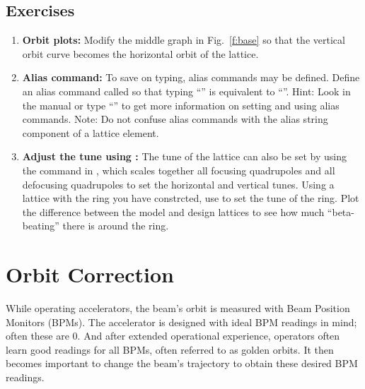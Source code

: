 \documentclass{hitec}     %
\begin{document}
{{{{\vspace{1in}

\subsection{Exercises}

\begin{enumerate}[leftmargin=*]
%
\item {\bf Orbit plots:} Modify the middle graph in Fig.~\ref{f:base} so that the vertical orbit curve becomes the horizontal orbit of the  lattice.
%
\item {\bf Alias command:} To save on typing, alias commands may be defined. Define an alias command called  so that typing ``'' is equivalent to ``''. Hint: Look in the manual or type ``'' to get more information on setting and using alias commands.
Note: Do not confuse \tao alias commands with the alias string component of a lattice element.
%
\item {\bf Adjust the tune using :} The tune of the lattice can also be set by using the  command in \tao, which scales together all focusing quadrupoles and all defocusing quadrupoles to set the horizontal and vertical tunes. Using a lattice with the ring you have constrcted, use  to set the tune of the ring. Plot the difference between the model and design lattices to see how much ``beta-beating'' there is around the ring.
%
\end{enumerate}

\newpage

\section{Orbit Correction}
\label{s:orbit}

While operating accelerators, the beam's orbit is measured with Beam Position Monitors (BPMs). The accelerator is designed with ideal BPM readings in mind; often these are 0. And after extended operational experience, operators often learn good readings for all BPMs, often referred to as golden orbits. It then becomes important to change the beam's trajectory to obtain these desired BPM readings.

}}}}
\end{document}
